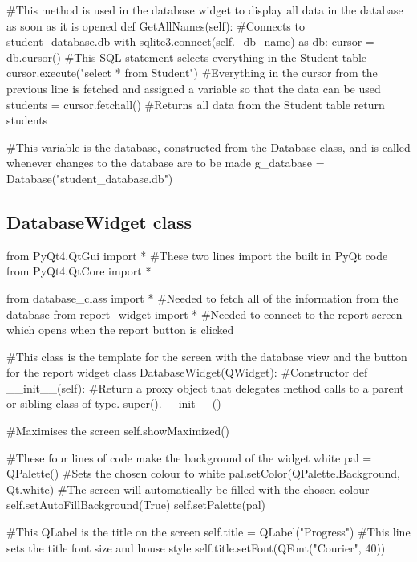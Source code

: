 \begin{landscape}
\begin{python}
    #This method is used in the database widget to display all data in the database as soon as it is opened
    def GetAllNames(self):
        #Connects to student_database.db
        with sqlite3.connect(self._db_name) as db:
            cursor = db.cursor()
            #This SQL statement selects everything in the Student table
            cursor.execute("select * from Student")
            #Everything in the cursor from the previous line is fetched and assigned a variable so that the data can be used
            students = cursor.fetchall()
            #Returns all data from the Student table
            return students

#This variable is the database, constructed from the Database class, and is called whenever changes to the database are to be made
g_database = Database("student_database.db")
\end{python}

\subsection{DatabaseWidget class}

\begin{python}
from PyQt4.QtGui import * #These two lines import the built in PyQt code
from PyQt4.QtCore import *

from database_class import * #Needed to fetch all of the information from the database
from report_widget import * #Needed to connect to the report screen which opens when the report button is clicked

#This class is the template for the screen with the database view and the button for the report widget
class DatabaseWidget(QWidget):
    #Constructor
    def __init__(self):
        #Return a proxy object that delegates method calls to a parent or sibling class of type.
        super().__init__()

        #Maximises the screen
        self.showMaximized()

        #These four lines of code make the background of the widget white
        pal = QPalette()
        #Sets the chosen colour to white
        pal.setColor(QPalette.Background, Qt.white)
        #The screen will automatically be filled with the chosen colour
        self.setAutoFillBackground(True)
        self.setPalette(pal)

        #This QLabel is the title on the screen
        self.title = QLabel("Progress")
        #This line sets the title font size and house style
        self.title.setFont(QFont("Courier", 40))


\end{python}
\end{landscape}
